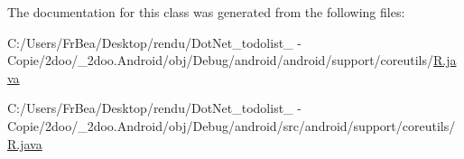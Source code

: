 The documentation for this class was generated from the following files:\begin{CompactItemize}
\item 
C:/Users/FrBea/Desktop/rendu/DotNet\_\-todolist\_ - Copie/2doo/\_\-2doo.Android/obj/Debug/android/android/support/coreutils/\hyperlink{android_2support_2coreutils_2_r_8java}{R.java}\item 
C:/Users/FrBea/Desktop/rendu/DotNet\_\-todolist\_ - Copie/2doo/\_\-2doo.Android/obj/Debug/android/src/android/support/coreutils/\hyperlink{src_2android_2support_2coreutils_2_r_8java}{R.java}\end{CompactItemize}
